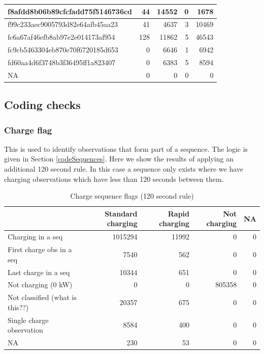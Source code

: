 \documentclass[]{article}
\newenvironment{Shaded}{\begin{snugshade}}{\end{snugshade}}
\newcommand{\DataTypeTok}[1]{\textcolor[rgb]{0.13,0.29,0.53}{#1}}
\newcommand{\KeywordTok}[1]{\textcolor[rgb]{0.13,0.29,0.53}{\textbf{#1}}}
\newcommand{\NormalTok}[1]{#1}
\newcommand{\OperatorTok}[1]{\textcolor[rgb]{0.81,0.36,0.00}{\textbf{#1}}}
\newcommand{\StringTok}[1]{\textcolor[rgb]{0.31,0.60,0.02}{#1}}
\begin{document}
\begin{table}[t]
\begin{tabular}{l|r|r|r|r}
\hline
f8afdd8b06b89cfcfadd75f5146736cd & 44 & 14552 & 0 & 1678\\
\hline
f99c233aec9005793d82e64afb45aa23 & 41 & 4637 & 3 & 10469\\
\hline
fc6a67af46efb8ab97e2e014173af954 & 128 & 11862 & 5 & 46543\\
\hline
fc9cb5463304eb870e70f6720185d653 & 0 & 6646 & 1 & 6942\\
\hline
fd60aa4d6f3748b3f36495ff1a823407 & 0 & 6383 & 5 & 8594\\
\hline
NA & 0 & 0 & 0 & 0\\
\hline
\end{tabular}
\end{table}

\hypertarget{coding-checks}{%
\subsection{Coding checks}\label{coding-checks}}

\hypertarget{chargeFlagTest}{%
\subsubsection{Charge flag}\label{chargeFlagTest}}

This is used to identify observations that form part of a sequence. The logic is given in Section \ref{codeSequences}. Here we show the results of applying an additional 120 second rule. In this case a sequence only exists where we have charging observations which have less than 120 seconds between them.

\begin{Shaded}
\end{Shaded}

\begin{table}[t]

\caption{\label{tab:checkChargeFlagMethods}Charge sequence flags (120 second rule)}
\centering
\begin{tabular}{l|r|r|r|r}
\hline
  & Standard charging & Rapid charging & Not charging & NA\\
\hline
Charging in a seq & 1015294 & 11992 & 0 & 0\\
\hline
First charge obs in a seq & 7540 & 562 & 0 & 0\\
\hline
Last charge in a seq & 10344 & 651 & 0 & 0\\
\hline
Not charging (0 kW) & 0 & 0 & 805358 & 0\\
\hline
Not classified (what is this??) & 20357 & 675 & 0 & 0\\
\hline
Single charge observation & 8584 & 400 & 0 & 0\\
\hline
NA & 230 & 53 & 0 & 0\\
\hline
\end{tabular}
\end{table}
\end{document}
